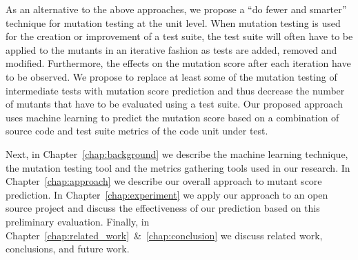 As an alternative to the above approaches, we propose a ``do fewer and smarter'' technique for mutation testing at the unit level.  When mutation testing is used for the creation or improvement of a test suite,  the test suite will often have to be applied to the mutants in an iterative fashion as tests are added, removed and modified. Furthermore, the effects on the mutation score after each iteration have to be observed. We propose to replace at least some of the mutation testing of intermediate tests with mutation score prediction and thus decrease the number of mutants that have to be evaluated using a test suite. Our proposed approach uses machine learning to predict the mutation score based on a combination of source code and test suite metrics of the code unit under test.

Next, in Chapter~\ref{chap:background} we describe the machine learning technique, the mutation testing tool and the metrics gathering tools used in our research. In Chapter~\ref{chap:approach} we describe our overall approach to mutant score prediction. In Chapter~\ref{chap:experiment} we apply our approach to an open source project and discuss the effectiveness of our prediction based on this preliminary evaluation. Finally, in Chapter~\ref{chap:related_work}~\&~\ref{chap:conclusion} we discuss related work, conclusions, and future work.
